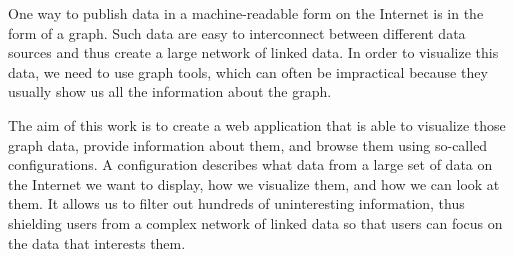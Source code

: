 \documentclass[12pt]{report}
\begin{document}

One way to publish data in a machine-readable form on the Internet is in the form of a graph. Such data are easy to interconnect between different data sources and thus create a large network of linked data. In order to visualize this data, we need to use graph tools, which can often be impractical because they usually show us all the information about the graph.

The aim of this work is to create a web application that is able to visualize those graph data, provide information about them, and browse them using so-called configurations. A configuration describes what data from a large set of data on the Internet we want to display, how we visualize them, and how we can look at them. It allows us to filter out hundreds of uninteresting information, thus shielding users from a complex network of linked data so that users can focus on the data that interests them.
\end{document}
